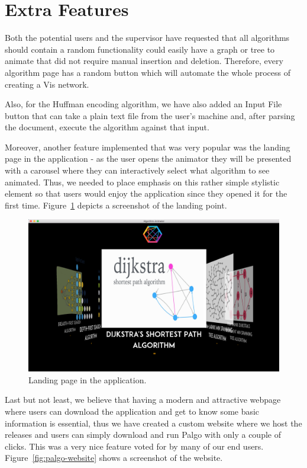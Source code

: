 \documentclass{l4proj}
\begin{document}
\section{Extra Features}

Both the potential users and the supervisor have requested that all algorithms should contain a random functionality
could easily have a graph or tree to animate that did not require manual insertion and deletion. Therefore, every
algorithm page has a random button which will automate the whole process of creating a Vis network.

Also, for the Huffman encoding algorithm, we have also added an Input File button that can take a plain text file from
the user's machine and, after parsing the document, execute the algorithm against that input. 

Moreover, another feature implemented that was very popular was the landing page in the application - as
the user opens the animator they will be presented with a carousel where they can interactively select what algorithm
to see animated. Thus, we needed to place emphasis on this rather simple stylistic element so that users would enjoy
the application since they opened it for the first time. Figure~\ref{fig:landing-page} depicts a screenshot of the landing point.

\begin{figure}[!ht]
\centering
\includegraphics[scale=0.2]{landing-page}
\caption{Landing page in the application.}
\label{fig:landing-page}
\end{figure}

\pagebreak

Last but not least, we believe that having a modern and attractive webpage where users can download the application and get to
know some basic information is essential, thus we have created a custom website where we host the releases and users can simply
download and run Palgo with only a couple of clicks. This was a very nice feature voted for by many of our end users.
Figure~\ref{fig:palgo-website} shows a screenshot of the website.
\end{document}
